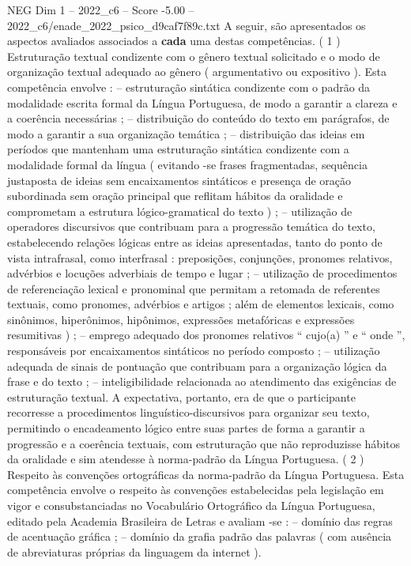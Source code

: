 \begin{textsample}{NEG Dim 1 – 2022\_c6 – Score -5.00 – 2022\_c6/enade\_2022\_psico\_d9caf7f89c.txt}
A seguir, são apresentados os aspectos avaliados associados a \textbf{cada} uma destas competências. ( 1 ) Estruturação textual condizente com o gênero textual solicitado e o modo de organização textual adequado ao gênero ( argumentativo ou expositivo ).
Esta competência envolve : – estruturação sintática condizente com o padrão da modalidade escrita formal da Língua Portuguesa, de modo a garantir a clareza e a coerência necessárias ; – distribuição do conteúdo do texto em parágrafos, de modo a garantir a sua organização temática ; – distribuição das ideias em períodos que mantenham uma estruturação sintática condizente com a modalidade formal da língua ( evitando -se frases fragmentadas, sequência justaposta de ideias sem encaixamentos sintáticos e presença de oração subordinada sem oração principal que reflitam hábitos da oralidade e comprometam a estrutura lógico-gramatical do texto ) ; – utilização de operadores discursivos que contribuam para a progressão temática do texto, estabelecendo relações lógicas entre as ideias apresentadas, tanto do ponto de vista intrafrasal, como interfrasal : preposições, conjunções, pronomes relativos, advérbios e locuções adverbiais de tempo e lugar ; – utilização de procedimentos de referenciação lexical e pronominal que permitam a retomada de referentes textuais, como pronomes, advérbios e artigos ; além de elementos lexicais, como sinônimos, hiperônimos, hipônimos, expressões metafóricas e expressões resumitivas ) ; – emprego adequado dos pronomes relativos “ cujo(a) ” e “ onde ”, responsáveis por encaixamentos sintáticos no período composto ; – utilização adequada de sinais de pontuação que contribuam para a organização lógica da frase e do texto ; – inteligibilidade relacionada ao atendimento das exigências de estruturação textual.
A expectativa, portanto, era de que o participante recorresse a procedimentos linguístico-discursivos para organizar seu texto, permitindo o encadeamento lógico entre suas partes de forma a garantir a progressão e a coerência textuais, com estruturação que não reproduzisse hábitos da oralidade e sim atendesse à norma-padrão da Língua Portuguesa. ( 2 ) Respeito às convenções ortográficas da norma-padrão da Língua Portuguesa.
Esta competência envolve o respeito às convenções estabelecidas pela legislação em vigor e consubstanciadas no Vocabulário Ortográfico da Língua Portuguesa, editado pela Academia Brasileira de Letras e avaliam -se : – domínio das regras de acentuação gráfica ; – domínio da grafia padrão das palavras ( com ausência de abreviaturas próprias da linguagem da internet ).

\end{textsample}

